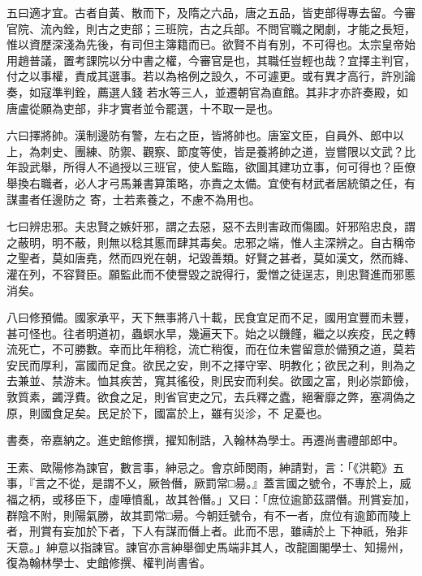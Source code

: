 \begin{pinyinscope}
 五曰適才宜。古者自黃、散而下，及隋之六品，唐之五品，皆吏部得專去留。今審官院、流內銓，則古之吏部；三班院，古之兵部。不問官職之閑劇，才能之長短，惟以資歷深淺為先後，有司但主簿籍而已。欲賢不肖有別，不可得也。太宗皇帝始用趙普議，置考課院以分中書之權，今審官是也，其職任豈輕也哉？宜擇主判官，付之以事權，責成其選事。若以為格例之設久，不可遽更。或有異才高行，許別論奏，如寇準判銓，薦選人錢
 若水等三人，並遷朝官為直館。其非才亦許奏殿，如唐盧從願為吏部，非才實者並令罷選，十不取一是也。



 六曰擇將帥。漢制邊防有警，左右之臣，皆將帥也。唐室文臣，自員外、郎中以上，為刺史、團練、防禦、觀察、節度等使，皆是養將帥之道，豈嘗限以文武？比年設武舉，所得人不過授以三班官，使人監臨，欲圖其建功立事，何可得也？臣僚舉換右職者，必人才弓馬兼書算策略，亦責之太備。宜使有材武者居統領之任，有謀畫者任邊防之
 寄，士若素養之，不慮不為用也。



 七曰辨忠邪。夫忠賢之嫉奸邪，謂之去惡，惡不去則害政而傷國。奸邪陷忠良，謂之蔽明，明不蔽，則無以稔其慝而肆其毒矣。忠邪之端，惟人主深辨之。自古稱帝之聖者，莫如唐堯，然而四兇在朝，圮毀善類。好賢之甚者，莫如漢文，然而絳、灌在列，不容賢臣。願監此而不使譽毀之說得行，愛憎之徒逞志，則忠賢進而邪慝消矣。



 八曰修預備。國家承平，天下無事將八十載，民食宜足而不足，國用宜豐而未豐，
 甚可怪也。往者明道初，蟲螟水旱，幾遍天下。始之以饑饉，繼之以疾疫，民之轉流死亡，不可勝數。幸而比年稍稔，流亡稍復，而在位未嘗留意於備預之道，莫若安民而厚利，富國而足食。欲民之安，則不之擇守宰、明教化；欲民之利，則為之去兼並、禁游末。恤其疾苦，寬其徭役，則民安而利矣。欲國之富，則必崇節儉，敦質素，蠲浮費。欲食之足，則省官吏之冗，去兵釋之蠹，絕奢靡之弊，塞凋偽之原，則國食足矣。民足於下，國富於上，雖有災沴，不
 足憂也。



 書奏，帝嘉納之。進史館修撰，擢知制誥，入翰林為學士。再遷尚書禮部郎中。



 王素、歐陽修為諫官，數言事，紳忌之。會京師閔雨，紳請對，言：「《洪範》五事，『言之不從，是謂不乂，厥咎僭，厥罰常□昜。』蓋言國之號令，不專於上，威福之柄，或移臣下，虛嘩憤亂，故其咎僭。」又曰：「庶位逾節茲謂僭。刑賞妄加，群陰不附，則陽氣勝，故其罰常□昜。今朝廷號令，有不一者，庶位有逾節而陵上者，刑賞有妄加於下者，下人有謀而僭上者。此而不思，雖禱於上
 下神祇，殆非天意。」紳意以指諫官。諫官亦言紳舉御史馬端非其人，改龍圖閣學士、知揚州，復為翰林學士、史館修撰、權判尚書省。




\end{pinyinscope}
